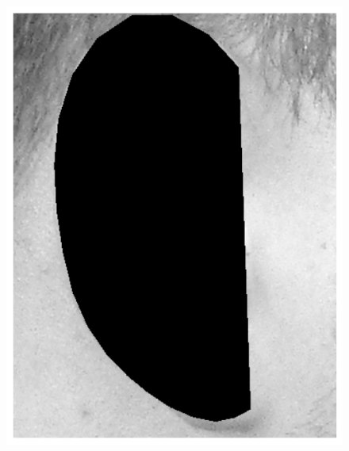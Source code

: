 \begin{figure}
    \centering
    \newcommand{\flowhh}{0.36\columnwidth}
    \newcommand{\flowh}{0.32\columnwidth}
    \includegraphics[height=\flowhh]{resources/Ear_Deformable_Model/verification/background_exp/ear_bg_0}
    \hfill

\end{figure}

